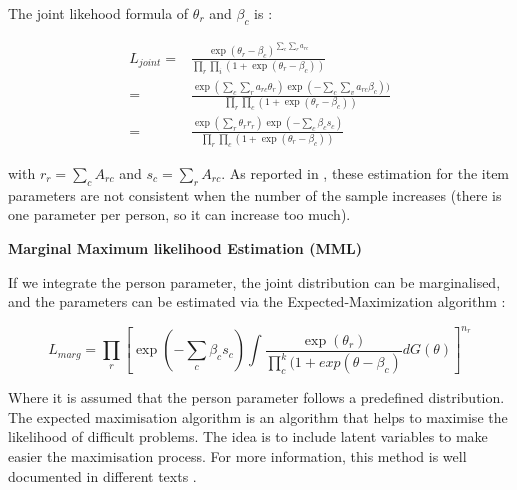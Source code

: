The joint likehood formula of $\theta_r$ and $\beta_c$ is \cite{wright1969procedure} \cite{mair2009extended}:

\vspace{5 mm}

\begin{equation}
\begin{aligned}
L_{joint} =& \frac{\exp(\theta_r - \beta_c)^{\sum_c \sum_r a_{rc}}}{\prod_r \prod_i (1 + \exp(\theta_r - \beta_c))} \\[3.5ex]
    =& \frac{\exp(\sum_c \sum_r a_{rc} \theta_r) \exp(-\sum_c \sum_v a_{rc}\beta_c))}{\prod_r \prod_c (1 + \exp(\theta_r - \beta_c))} \\[3.5ex]
    =& \frac{\exp(\sum_r \theta_r r_r) \exp(-\sum_c \beta_c s_c)}{\prod_r \prod_c (1 + \exp(\theta_r - \beta_c))}
\end{aligned}
\end{equation}

\vspace{8 mm}

with $r_r = \sum_c A_{rc}$ and $s_c = \sum_r A_{rc}$. As reported in \cite{haberman1977maximum}, these estimation for the item parameters are not consistent when the number of the sample increases (there is one parameter per person, so it can increase too much).

\vspace{5 mm}

\textbf{Marginal Maximum likelihood Estimation (MML)}

If we integrate the person parameter, the joint distribution can be marginalised, and the parameters can be estimated via the Expected-Maximization algorithm \cite{bock1981marginal} \cite{mair2009extended}:

\vspace{5 mm}

\begin{equation}
L_{marg} = \prod_r \left[ \exp(-\sum_c \beta_c s_c) \int \frac{\exp(\theta_r)}{\prod_c^k (1 + exp(\theta-\beta_c)} dG(\theta)  \right]^{n_r}
\end{equation}

\vspace{5 mm}

Where it is assumed that the person parameter follows a predefined distribution. The expected maximisation algorithm is an algorithm that helps to maximise the likelihood of difficult problems. The idea is to include latent variables to make easier the maximisation process. For more information, this method is well documented in different texts \cite{friedman2009elements} \cite{bishop2006pattern}.

